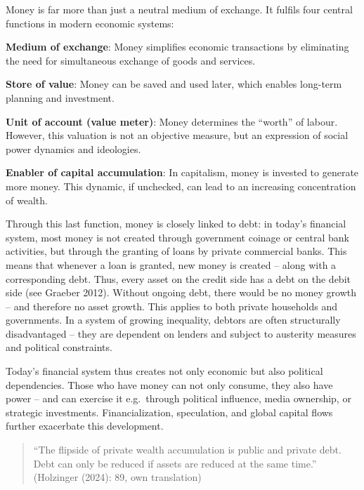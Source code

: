 \documentclass[
  a4paper,
  openany]{book}
\begin{document}
\begin{tcolorbox}[enhanced jigsaw, coltitle=black, bottomtitle=1mm, opacitybacktitle=0.6, titlerule=0mm, opacityback=0, leftrule=.75mm, colbacktitle=quarto-callout-note-color!10!white, bottomrule=.15mm, toptitle=1mm, breakable, title={What we need to understand about money and debt}, arc=.35mm, rightrule=.15mm, toprule=.15mm, left=2mm, colback=white, colframe=quarto-callout-note-color-frame]

Money is far more than just a neutral medium of exchange. It fulfils
four central functions in modern economic systems:

\textbf{Medium of exchange}: Money simplifies economic transactions by
eliminating the need for simultaneous exchange of goods and services.

\textbf{Store of value}: Money can be saved and used later, which
enables long-term planning and investment.

\textbf{Unit of account (value meter)}: Money determines the ``worth''
of labour. However, this valuation is not an objective measure, but an
expression of social power dynamics and ideologies.

\textbf{Enabler of capital accumulation}: In capitalism, money is
invested to generate more money. This dynamic, if unchecked, can lead to
an increasing concentration of wealth.

Through this last function, money is closely linked to debt: in today's
financial system, most money is not created through government coinage
or central bank activities, but through the granting of loans by private
commercial banks. This means that whenever a loan is granted, new money
is created -- along with a corresponding debt. Thus, every asset on the
credit side has a debt on the debit side (see Graeber 2012). Without
ongoing debt, there would be no money growth -- and therefore no asset
growth. This applies to both private households and governments. In a
system of growing inequality, debtors are often structurally
disadvantaged -- they are dependent on lenders and subject to austerity
measures and political constraints.

Today's financial system thus creates not only economic but also
political dependencies. Those who have money can not only consume, they
also have power -- and can exercise it e.g.~through political influence,
media ownership, or strategic investments. Financialization,
speculation, and global capital flows further exacerbate this
development.

\begin{quote}
``The flipside of private wealth accumulation is public and private
debt. Debt can only be reduced if assets are reduced at the same time.''
(Holzinger (2024): 89, own translation)
\end{quote}

\end{tcolorbox}
\end{document}
